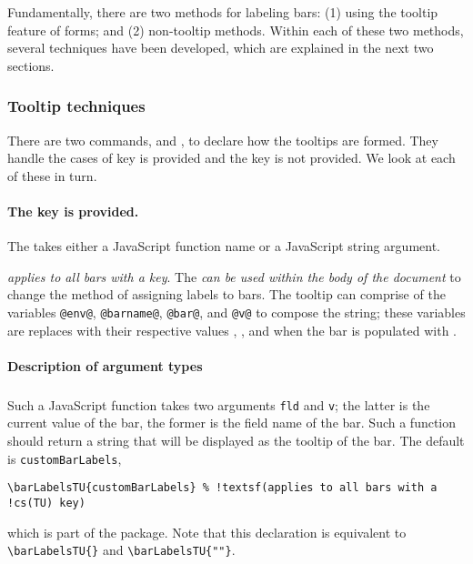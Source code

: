 \documentclass{article}
\edef\amtIndent{\the\parindent}
\begin{document}
Fundamentally, there are two methods for labeling bars: (1) using the tooltip
feature of {\PDF} forms; and (2) non-tooltip methods. Within each of these
two methods, several techniques have been developed, which are explained in
the next two sections.

\subsubsection{Tooltip techniques}

There are two commands,  and , to declare
how the {\PDF} tooltips are formed. They handle the cases of  key is
provided and the  key is not provided. We look at each of these in
turn.

\paragraph*{The  key is provided.} The  takes either a
JavaScript function name or a JavaScript string argument.
\bVerb{}%
\begin{dCmd}[commandchars=!()]{\bxSize}
\end{dCmd}
\eVerb {} \emph{applies to all bars with a  key}. The
 \emph{can be used within the body of the document} to change the
method of assigning labels to bars. The tooltip can comprise of the variables
\texttt{@env@}, \texttt{@barname@}, \texttt{@bar@}, and \texttt{@v@} to
compose the string; these variables are replaces with their respective values
, ,  and  when
the bar is populated with .

\paragraph*{Description of argument types}
\subparagraph*{} Such a JavaScript function takes two
arguments \texttt{fld} and \texttt{v}; the latter is the current value of the
bar, the former is the field name of the bar. Such a function should return a
string that will be displayed as the tooltip of the bar. The default is
\texttt{customBarLabels},
\begin{Verbatim}[xleftmargin=\amtIndent,fontsize=\small,commandchars=!()]
\barLabelsTU{customBarLabels} % !textsf(applies to all bars with a !cs(TU) key)
\end{Verbatim}
which is part of the  package. Note that this declaration
is equivalent to \verb|\barLabelsTU{}| and \verb|\barLabelsTU{""}|.
\end{document}
